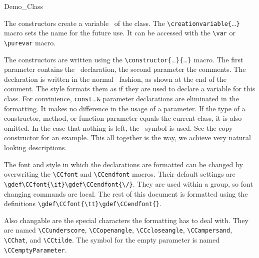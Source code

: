 \documentclass[12pt]{article}
\begin{document}
\begin{class}{Demo_Class}
{
\creation

The constructors create a variable \var\ of the class. The
\verb"\"\verb"creationvariable{"\ldots\verb"}" macro sets the name for the
future use. It can be accessed with the \verb"\var" or
\verb"\purevar" macro.

The constructors are written using the
\verb"\"\verb"constructor{"\ldots\verb"}{"\ldots\verb"}" macro. The first
parameter contains the \CC\ declaration, the second parameter the comments.
The declaration is written in the normal \CC\ fashion, as shown at the end
of the comment. The style formats them as if they are used
to declare a variable for this class. For convinience,
\verb"const"\ldots\verb"&" parameter declarations are eliminated in the
formatting. It makes no difference in the usage of a parameter. If the
type of a constructor, method, or function parameter equals the
current class, it is also omitted. In the case that nothing is left,
the \CCemptyParameter\ symbol is used. See the copy constructor for an
example. This all together is the way, we achieve very
natural looking descriptions.




The font and style in which the declarations are formatted can be
changed by overwriting the \verb"\CCfont" and \verb"\CCendfont"
macros. Their default settings are
\verb"\gdef\CCfont{\it}\gdef\CCendfont{\/}". They are used within a
group, so font changing commands are local. The rest of this document is
formatted using the definitions \verb"\gdef\CCfont{\tt}\gdef\CCendfont{}".

\gdef\CCfont{\tt}\gdef\CCendfont{}

Also changable are the special characters the formatting has to
deal with. They are named \verb"\CCunderscore", \verb"\CCopenangle",
\verb"\CCcloseangle", \verb"\CCampersand", \verb"\CChat", and
\verb"\CCtilde". The symbol for the empty parameter is named
\verb"\CCemptyParameter".

  \operations
  \threecolumns{2.8cm}{2.8cm}

}
\end{class}
\end{document}
